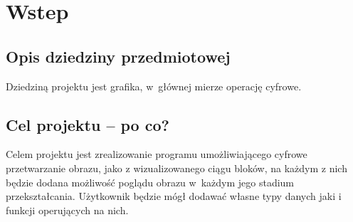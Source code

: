 \section{Wstep}
\subsection{Opis dziedziny przedmiotowej}
Dziedziną projektu jest grafika, w~głównej mierze operację cyfrowe. 
\subsection{Cel projektu – po co?}
Celem projektu jest zrealizowanie programu umożliwiającego cyfrowe przetwarzanie obrazu, jako z wizualizowanego ciągu bloków, na każdym z nich będzie dodana możliwość poglądu obrazu w~każdym jego stadium przekształcania. Użytkownik będzie mógł dodawać własne typy danych jaki i funkcji operujących na nich. 
